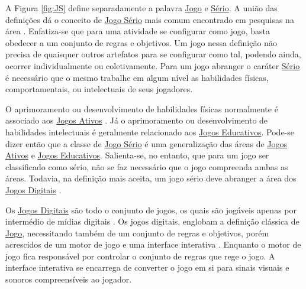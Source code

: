 \vspace{-0,4cm}

A Figura \ref{fig:JS} define separadamente a palavra \underline{Jo}g\underline{o} e \underline{Sério}. A união das definições dá o conceito de \underline{Jo}g\underline{o Sério} mais comum encontrado em pesquisas na área \cite{michael2005serious}. Enfatiza-se que para uma atividade se configurar como jogo, basta obedecer a um conjunto de regras e objetivos. Um jogo nessa definição não precisa de quaisquer outros artefatos para se configurar como tal, podendo ainda, ocorrer individualmente ou coletivamente. Para um jogo abranger o caráter \underline{Sério} é necessário que o mesmo trabalhe em algum nível as habilidades físicas, comportamentais, ou intelectuais de seus jogadores. 

\vspace{-0,1cm}

O aprimoramento ou desenvolvimento de habilidades físicas normalmente é associado aos \underline{Jo}g\underline{os Ativos} \cite{araujo2017exergames, schroeder2017wobu}. Já o aprimoramento ou desenvolvimento de habilidades intelectuais é geralmente relacionado aos \underline{Jo}g\underline{os Educativos}. Pode-se dizer então que a classe de \underline{Jo}g\underline{o Sério} é uma generalização das áreas de \underline{Jo}g\underline{os Ativos} e \underline{Jo}g\underline{os Educativos}. Salienta-se, no entanto, que para um jogo ser classificado como sério, não se faz necessário que o jogo compreenda ambas as áreas. Todavia, na definição mais aceita, um jogo sério deve abranger a área dos  \underline{Jo}g\underline{os Di}g\underline{itais} \cite{laamarti2014overview}.


\vspace{-0,1cm}

Os \underline{Jo}g\underline{os Di}g\underline{itais} são todo o conjunto de jogos, os quais são jogáveis apenas por intermédio de mídias digitais \cite{lucchese2009conceituaccao}. Os jogos digitais, englobam a definição clássica de \underline{Jo}g\underline{o}, necessitando também de um conjunto de regras e objetivos, porém acrescidos de um motor de jogo e uma interface interativa \cite{battaiola2000jogos}. Enquanto o motor de jogo fica responsável por controlar o conjunto de regras que rege o jogo. A interface interativa se encarrega de converter o jogo em si para sinais visuais e sonoros compreensíveis ao jogador.

